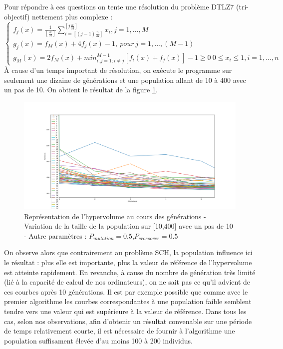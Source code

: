 \documentclass[12pt]{report}
\begin{document}
      Pour répondre à ces questions on tente une résolution du problème DTLZ7 (tri-objectif) nettement plus complexe :
      $$
      \left\{
        \begin{array}{ll}
           f_{j}(x) = \frac{1}{[\frac{n}{M}]} \sum_{i=[(j-1)\frac{n}{M}]}^{[j\frac{n}{M}]}x_i , j=1,...,M  \\
           g_{j}(x) = f_{M}(x) + 4f_{j}(x) - 1, \  pour\   j = 1,...,(M-1) \\
           g_{M}(x) = 2f_{M}(x) + min_{i,j = 1 ; i \neq j}^{M-1}[f_i(x)+f_j(x)] - 1 \ge 0 \  0 \le x_i \le 1, i = 1,...,n
        \end{array}
      \right.
      $$
      À cause d'un temps important de résolution, on exécute le programme sur seulement une dizaine de générations et une population allant de 10 à 400 avec un pas de 10.
      On obtient le résultat de la figure \ref{DTLZ7_pop}.
      \begin{figure}[h]
        \centering
        \includegraphics[width=15cm]{img/DTLZ7_pop.png}
        \caption{Représentation de l'hypervolume au cours des générations - Variation de la taille de la population sur [10,400] avec un pas de 10 - Autre paramètres : $P_{mutation} = 0.5$,$P_{crossover} = 0.5$}
        \label{DTLZ7_pop}
      \end{figure}

      On observe alors que contrairement au problème SCH, la population influence ici le résultat : plus elle est importante, plus la valeur de référence de l'hypervolume est atteinte rapidement. En revanche, à cause du nombre de génération très limité (lié à la capacité de calcul de nos ordinateurs), on ne sait pas ce qu'il advient de ces courbes après 10 générations. Il est par exemple possible que comme avec le premier algorithme les courbes correspondantes à une population faible semblent tendre vers une valeur qui est supérieure à la valeur de référence.
      Dans tous les cas, selon nos observations, afin d'obtenir un résultat convenable sur une période de temps relativement courte, il est nécessaire de fournir à l'algorithme une population suffisament élevée d'au moins 100 à 200 individus.
\end{document}
